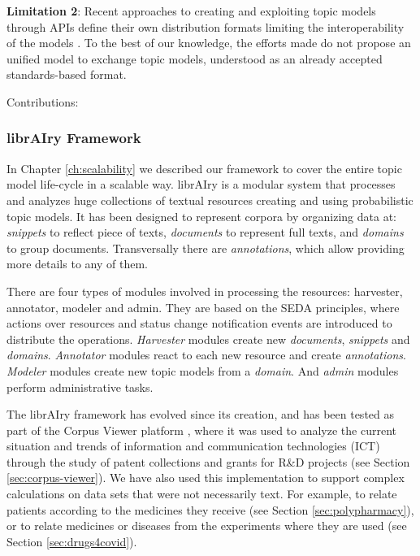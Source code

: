 \textbf{Limitation 2}: Recent approaches to creating and exploiting topic models through APIs define their own distribution formats limiting the interoperability of the models \citep{Lisena:NLPOSS2020}. To the best of our knowledge, the efforts made do not propose an unified model to exchange topic models, understood as an already accepted standards-based format.

Contributions:
























\subsubsection{librAIry Framework}

In Chapter \ref{ch:scalability} we described our framework to cover the entire topic model life-cycle in a scalable way. librAIry is a modular system that processes and analyzes huge collections of textual resources creating and using probabilistic topic models. It has been designed to represent corpora by organizing data at: \textit{snippets} to reflect piece of texts, \textit{documents} to represent full texts, and \textit{domains} to group documents. Transversally there are \textit{annotations}, which allow providing more details to any of them.

There are four types of modules involved in processing the resources: harvester, annotator, modeler and admin. They are based on the SEDA principles, where actions over resources and status change notification events are introduced to distribute the operations. \textit{Harvester} modules create new \textit{documents}, \textit{snippets} and \textit{domains}. \textit{Annotator} modules react to each new resource and create \textit{annotations}. \textit{Modeler} modules create new topic models from a \textit{domain}. And \textit{admin} modules perform administrative tasks.

The librAIry framework has evolved since its creation, and has been tested as part of the Corpus Viewer platform \citep{Samy2019}, where it was used to analyze the current situation and trends of information and communication technologies (ICT) through the study of patent collections and grants for R\&D projects (see Section \ref{sec:corpus-viewer}). We have also used this implementation to support complex calculations on data sets that were not necessarily text. For example, to relate patients according to the medicines they receive \citep{Badenes-Olmedo2019c} (see Section 	\ref{sec:polypharmacy}), or to relate medicines or diseases from the experiments where they are used (see Section \ref{sec:drugs4covid}).

